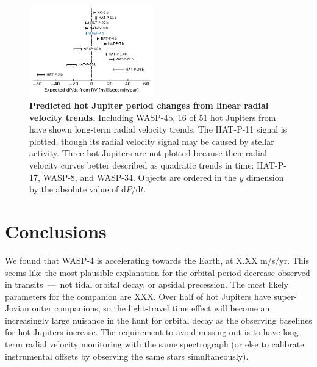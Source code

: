 \documentclass[12pt,twocolumn,tighten]{aastex62}
\begin{document}
\begin{figure}[t]
	\begin{center}
		\leavevmode
		\includegraphics[width=0.48\textwidth]{f5.pdf}
	\end{center}
	\vspace{-0.7cm}
	\caption{
  {\bf Predicted hot Jupiter period changes from linear radial
  velocity trends.} Including WASP-4b, 16 of 51 hot Jupiters from
  \citet{knutson_friends_2014} have shown long-term radial velocity
  trends.  The HAT-P-11 signal is plotted, though its radial velocity
  signal may be caused by stellar activity.  Three hot Jupiters are
  not plotted because their radial velocity curves better described as
  quadratic trends in time: HAT-P-17, WASP-8, and WASP-34.  Objects
  are ordered in the $y$ dimension by the absolute value of d$P$/d$t$.
	\label{fig:pdot_pop}
  \vspace{-0.3cm}
	}
\end{figure}


\section{Conclusions}
\label{sec:conclusions}

We found that WASP-4 is accelerating towards the Earth, at
X.XX m/s/yr.
This seems like the most plausible explanation for the orbital 
period decrease observed in transits~---~not tidal
orbital decay, or apsidal precession.
The most likely parameters for the companion are XXX.
Over half of hot Jupiters have super-Jovian outer companions,
so the light-travel time effect will become an increasingly large nuisance in
the hunt for orbital decay as
the observing baselines for hot Jupiters increase.
The requirement to avoid missing out is to have long-term
radial velocity monitoring with the same spectrograph (or else to
calibrate instrumental offsets by observing the same stars simultaneously).



\end{document}
